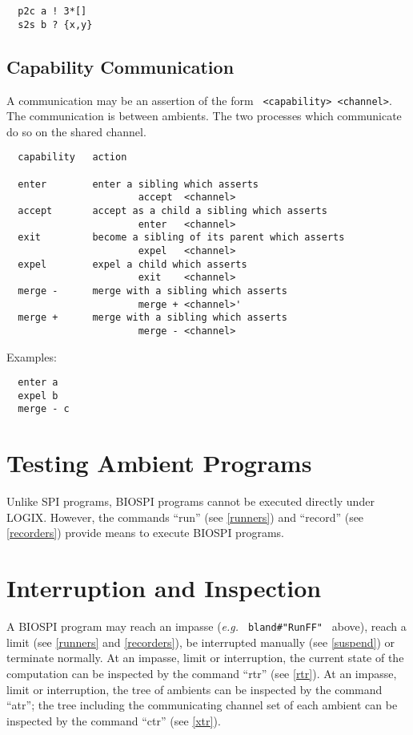 \noindent

\begin{verbatim}
  p2c a ! 3*[]
  s2s b ? {x,y}
\end{verbatim}

\subsection{Capability Communication}

A communication may be an assertion of the form \verb+ <capability> <channel>+.
The communication is between ambients.  The two
processes which communicate do so on the shared channel.

\begin{verbatim}
  capability   action

  enter        enter a sibling which asserts
                       accept  <channel>
  accept       accept as a child a sibling which asserts
                       enter   <channel>
  exit         become a sibling of its parent which asserts
                       expel   <channel>
  expel        expel a child which asserts
                       exit    <channel>
  merge -      merge with a sibling which asserts
                       merge + <channel>'
  merge +      merge with a sibling which asserts
                       merge - <channel>
\end{verbatim}

\noindent
Examples:

\begin{verbatim}
  enter a
  expel b
  merge - c
\end{verbatim}

\section{Testing Ambient Programs}

Unlike SPI programs, BIOSPI programs cannot be
executed directly under LOGIX.  However, the commands ``run'' (see
\ref{runners}) and ``record'' (see \ref{recorders})
provide means to execute BIOSPI programs.

\section{Interruption and Inspection}

A BIOSPI program may reach an impasse ({\em e.g.}
\verb+ bland#"RunFF" + above), reach a limit (see \ref{runners}
and \ref{recorders}), be interrupted manually (see \ref{suspend})
or terminate normally.  At an impasse, limit or interruption,
the current state of the computation can be inspected by the command
``rtr'' (see \ref{rtr}).
At an impasse, limit or interruption, the tree of ambients can be inspected
by the command ``atr''; the tree including the communicating channel
set of each ambient can be inspected by the command ``ctr''
(see \ref{xtr}).

